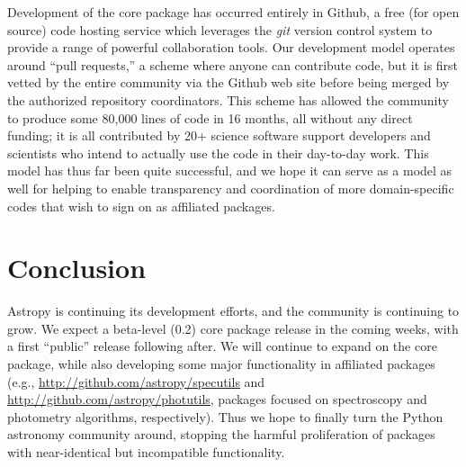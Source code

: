 Development of the core package has occurred entirely in Github, a free (for open source) code hosting service which leverages the {\it {}git} version control system to provide a range of powerful collaboration tools.  Our development model operates around ``pull requests,'' a scheme where anyone can contribute code, but it is first vetted by the entire community via the Github web site before being merged by the authorized repository coordinators. This scheme has allowed the community to produce some 80,000 lines of code in 16 months, all without any direct funding; it is all contributed by 20+  science software support developers and scientists who intend to actually use the code in their day-to-day work.  This model has thus far been quite successful, and we hope it can serve as a model as well for helping to enable transparency and coordination of more domain-specific codes that wish to sign on as affiliated packages.

\section{Conclusion}
Astropy is continuing its development efforts, and the community is continuing to grow.  We expect a beta-level (0.2) core package release in the coming weeks, with a first ``public'' release following after.  We will continue to expand on the core package, while also developing some major functionality in affiliated packages (e.g., \url{http://github.com/astropy/specutils} and \url{http://github.com/astropy/photutils}, packages focused on spectroscopy and photometry algorithms, respectively). Thus we hope to finally turn the Python astronomy community around, stopping the harmful proliferation of packages with near-identical but incompatible functionality.
